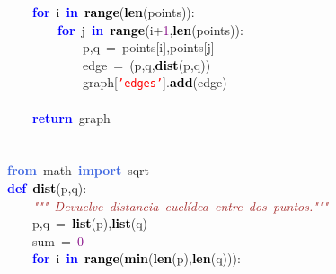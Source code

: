 \mbox{}\ \ \ \ \textbf{\textcolor{Blue}{for}}\ i\ \textbf{\textcolor{Blue}{in}}\ \textbf{\textcolor{Black}{range}}\textcolor{BrickRed}{(}\textbf{\textcolor{Black}{len}}\textcolor{BrickRed}{(}points\textcolor{BrickRed}{)):}\  \\
\mbox{}\ \ \ \ \ \ \ \ \textbf{\textcolor{Blue}{for}}\ j\ \textbf{\textcolor{Blue}{in}}\ \textbf{\textcolor{Black}{range}}\textcolor{BrickRed}{(}i\textcolor{BrickRed}{+}\textcolor{Purple}{1}\textcolor{BrickRed}{,}\textbf{\textcolor{Black}{len}}\textcolor{BrickRed}{(}points\textcolor{BrickRed}{)):} \\
\mbox{}\ \ \ \ \ \ \ \ \ \ \ \ p\textcolor{BrickRed}{,}q\ \textcolor{BrickRed}{=}\ points\textcolor{BrickRed}{[}i\textcolor{BrickRed}{],}points\textcolor{BrickRed}{[}j\textcolor{BrickRed}{]} \\
\mbox{}\ \ \ \ \ \ \ \ \ \ \ \ edge\ \textcolor{BrickRed}{=}\ \textcolor{BrickRed}{(}p\textcolor{BrickRed}{,}q\textcolor{BrickRed}{,}\textbf{\textcolor{Black}{dist}}\textcolor{BrickRed}{(}p\textcolor{BrickRed}{,}q\textcolor{BrickRed}{))} \\
\mbox{}\ \ \ \ \ \ \ \ \ \ \ \ graph\textcolor{BrickRed}{[}\texttt{\textcolor{Red}{'edges'}}\textcolor{BrickRed}{].}\textbf{\textcolor{Black}{add}}\textcolor{BrickRed}{(}edge\textcolor{BrickRed}{)} \\
\mbox{}\ \ \ \ \ \ \ \ \ \ \ \  \\
\mbox{}\ \ \ \ \textbf{\textcolor{Blue}{return}}\ graph \\
\mbox{} \\
\mbox{} \\
\mbox{}\textbf{\textcolor{RoyalBlue}{from}}\ math\ \textbf{\textcolor{RoyalBlue}{import}}\ sqrt \\
\mbox{}\textbf{\textcolor{Blue}{def}}\ \textbf{\textcolor{Black}{dist}}\textcolor{BrickRed}{(}p\textcolor{BrickRed}{,}q\textcolor{BrickRed}{):} \\
\mbox{}\textit{\textcolor{Brown}{\ \ \ \ "{}"{}"{}\ Devuelve\ distancia\ euclídea\ entre\ dos\ puntos."{}"{}"{}}} \\
\mbox{}\ \ \ \ p\textcolor{BrickRed}{,}q\ \textcolor{BrickRed}{=}\ \textbf{\textcolor{Black}{list}}\textcolor{BrickRed}{(}p\textcolor{BrickRed}{),}\textbf{\textcolor{Black}{list}}\textcolor{BrickRed}{(}q\textcolor{BrickRed}{)} \\
\mbox{}\ \ \ \ sum\ \textcolor{BrickRed}{=}\ \textcolor{Purple}{0} \\
\mbox{}\ \ \ \ \textbf{\textcolor{Blue}{for}}\ i\ \textbf{\textcolor{Blue}{in}}\ \textbf{\textcolor{Black}{range}}\textcolor{BrickRed}{(}\textbf{\textcolor{Black}{min}}\textcolor{BrickRed}{(}\textbf{\textcolor{Black}{len}}\textcolor{BrickRed}{(}p\textcolor{BrickRed}{),}\textbf{\textcolor{Black}{len}}\textcolor{BrickRed}{(}q\textcolor{BrickRed}{))):} \\
